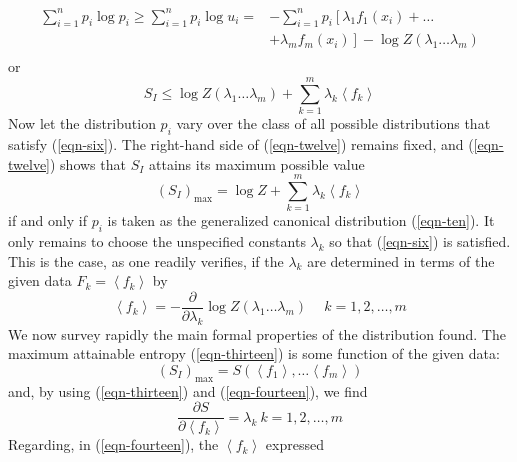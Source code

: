 \documentclass[]{article}
\begin{document}
\begin{align*}
\sum_{i = 1}^{n}   p_{i}\log p_{i} \geq \sum_{i = 1}^{n}   p_{i}\log u_{i} = &  - \sum_{i = 1}^{n}   p_{i}\left\lbrack \lambda_{1}f_{1}\left( x_{i} \right) + \ldots \right. \\
 & \left.  + \lambda_{m}f_{m}\left( x_{i} \right) \right\rbrack - \log Z\left( \lambda_{1}\ldots\lambda_{m} \right) \\
\end{align*}
%
or
%
\begin{equation}
S_{I} \leq  \log Z\left( \lambda_{1}\ldots\lambda_{m} \right) + \sum_{k = 1}^{m} \lambda_{k}\left\langle f_{k} \right\rangle \label{eqn-twelve}
\end{equation}
%
Now let the distribution \(p_{i}\) vary over the class of all possible
distributions that satisfy (\ref{eqn-six}). The right-hand side of (\ref{eqn-twelve}) remains
fixed, and (\ref{eqn-twelve}) shows that \(S_{I}\) attains its maximum possible value
%
\begin{equation}
\left( S_{I} \right)_{\max} =  \log Z + \sum_{k = 1}^{m} \lambda_{k}\left\langle f_{k} \right\rangle \label{eqn-thirteen}
\end{equation}
%
if and only if \(p_{i}\) is taken as the generalized canonical
distribution
(\ref{eqn-ten}). It only remains to choose the unspecified constants
\(\lambda_{k}\) so that (\ref{eqn-six}) is satisfied. This is the case, as one
readily verifies, if the \(\lambda_{k}\) are determined in terms of the
given data \(F_{k} = \left\langle f_{k} \right\rangle\) by
%
\begin{equation}
\left\langle f_{k} \right\rangle = - \frac{\partial}{\partial\lambda_{k}} \log Z\left( \lambda_{1}\ldots\lambda_{m} \right)\ \quad  k = 1,2,\ldots,m \label{eqn-fourteen}
\end{equation}
%
We now survey rapidly the main formal properties of the distribution
found. The maximum attainable entropy (\ref{eqn-thirteen}) is some function of the given
data:
%
\begin{equation}
\left( S_{I} \right)_{\max} = S\left( \left\langle f_{1} \right\rangle,\ldots\left\langle f_{m} \right\rangle \right)
\end{equation}
%
and, by using (\ref{eqn-thirteen}) and (\ref{eqn-fourteen}), we find
%
\begin{equation}
\frac{\partial S}{\partial\left\langle f_{k} \right\rangle} = \lambda_{k}\ k = 1,2,\ldots,m \label{eqn-sixteen}
\end{equation}
%
Regarding, in (\ref{eqn-fourteen}), the \(\left\langle f_{k} \right\rangle\) expressed
\end{document}
